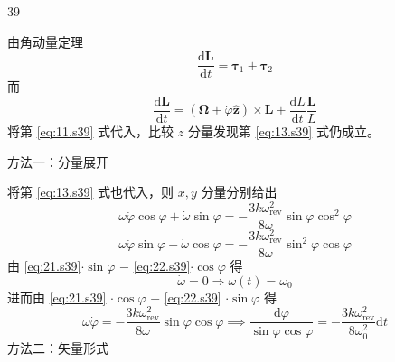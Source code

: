 \begin{solution}{39}
\begin{subsolution}
\begin{subsubsolution}
            由角动量定理
            \begin{equation}
                \frac {\mathrm{d} \pmb {L}}{\mathrm{d} t} = \pmb {\tau} _ {1} + \pmb {\tau} _ {2}
                \label{eq:19.s39}
            \end{equation}
            而
            \begin{equation}
                \frac {\mathrm{d} \pmb {L}}{\mathrm{d} t} = (\pmb {\Omega} + \dot {\varphi} \hat {\pmb {z}}) \times \pmb {L} + \frac {\mathrm{d} L}{\mathrm{d} t} \frac {\pmb {L}}{L}
                \label{eq:20.s39}
            \end{equation}
            将第 \eqref{eq:11.s39} 式代入，比较 $z$ 分量发现第 \eqref{eq:13.s39} 式仍成立。

            方法一：分量展开

            将第 \eqref{eq:13.s39} 式也代入，则 $x, y$ 分量分别给出
            \begin{equation}
                \omega \dot {\varphi} \cos \varphi + \dot {\omega} \sin \varphi = - \frac {3 k \omega_ {\mathrm{rev}} ^ {2}}{8 \omega} \sin \varphi \cos^ {2} \varphi
                \label{eq:21.s39}
            \end{equation}
            \begin{equation}
                \omega \dot {\varphi} \sin \varphi - \dot {\omega} \cos \varphi = - \frac {3 k \omega_ {\mathrm{rev}} ^ {2}}{8 \omega} \sin^ {2} \varphi \cos \varphi
                \label{eq:22.s39}
            \end{equation}
            由 \eqref{eq:21.s39}$\cdot \sin \varphi$ $-$ \eqref{eq:22.s39}$\cdot \cos \varphi$ 得
            \begin{equation}
                \dot {\omega} = 0 \Rightarrow \omega (t) = \omega_ {0}
                \label{eq:23.s39}
            \end{equation}
            进而由 \eqref{eq:21.s39} $\cdot \cos \varphi$ $+$ \eqref{eq:22.s39} $\cdot \sin \varphi$ 得
            \begin{equation}
                \omega \dot {\varphi} = - \frac {3 k \omega_ {\mathrm{rev}} ^ {2}}{8 \omega} \sin \varphi \cos \varphi \implies \frac {\mathrm{d} \varphi}{\sin \varphi \cos \varphi} = - \frac {3 k \omega_ {\mathrm{rev}} ^ {2}}{8 \omega_ {0} ^ {2}} \mathrm{d} t
                \label{eq:24.s39}
            \end{equation}
            方法二：矢量形式


\end{subsubsolution}
\end{subsolution}
\end{solution}
